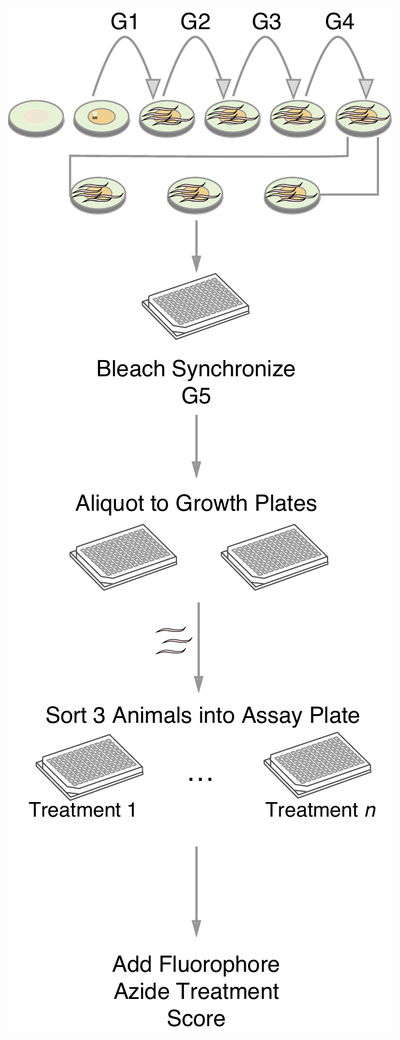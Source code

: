\documentclass[12pt]{article}
\begin{document}
\begin{figure}[h]
{\includegraphics[scale=0.5]{Figures/Appendix_Phenotyping.pdf}}
\end{figure}

\newpage
\end{document}
